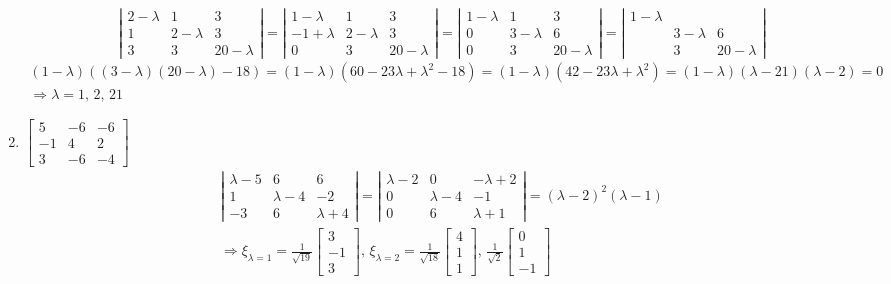 \documentclass[twoside]{amsart}
\theoremstyle{plain}
\theoremstyle{definition}
\begin{document}
\begin{enumerate}
\[\left| \begin{matrix} 2- \lambda & 1 & 3 \\ 1 & 2-\lambda & 3 \\ 3 & 3 & 20 - \lambda \end{matrix} \right| = \left| \begin{matrix} 1 - \lambda & 1 & 3 \\ -1 + \lambda & 2 - \lambda & 3 \\ 0 & 3 & 20-\lambda \end{matrix} \right| = \left| \begin{matrix} 1 - \lambda & 1 & 3 \\ 0 & 3-\lambda & 6 \\ 0 & 3 & 20 -\lambda \end{matrix} \right| = \left| \begin{matrix} 1-\lambda & & \\ & 3- \lambda & 6 \\ & 3 & 20 - \lambda \end{matrix} \right|
\]
\[
\begin{gathered}
(1-\lambda)((3-\lambda)(20-\lambda) -18) = (1-\lambda)(60 - 23 \lambda + \lambda^2 - 18) = (1-\lambda)(42 -23 \lambda + \lambda^2) = (1-\lambda)(\lambda -21)(\lambda - 2) = 0 \\
  \Longrightarrow \lambda = 1, \, 2, \, 21 
\end{gathered}
\]
\item $\left[ \begin{matrix} 5 & -6 & -6 \\ -1 & 4 & 2 \\ 3 & -6 & -4 \end{matrix} \right]$ 
\[
\begin{gathered}
  \left| \begin{matrix} \lambda -5 & 6 & 6 \\ 1 & \lambda -4 & -2 \\ -3 & 6 & \lambda +4 \end{matrix} \right| = \left| \begin{matrix} \lambda -2 & 0 & -\lambda + 2 \\ 0 & \lambda -4 & -1 \\ 0 & 6 & \lambda + 1 \end{matrix} \right| = (\lambda -2)^2 (\lambda -1 ) \\ 
  \Longrightarrow \xi_{\lambda =1} = \frac{1}{\sqrt{19}} \left[ \begin{matrix} 3 \\ -1 \\ 3 \end{matrix} \right] , \, \xi_{\lambda =2} = \frac{1}{\sqrt{18}} \left[ \begin{matrix} 4 \\ 1 \\ 1 \end{matrix} \right], \, \frac{1}{\sqrt{2}} \left[ \begin{matrix} 0 \\ 1 \\ -1 \end{matrix} \right]
\end{gathered}
\] 
\end{enumerate}
\end{document}
